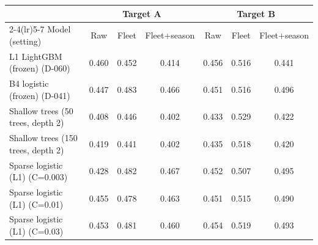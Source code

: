 \begin{tabular}{@{}lcccccc@{}}
\toprule
 & \multicolumn{3}{c}{Target A} & \multicolumn{3}{c}{Target B} \\
\cmidrule(lr){2-4}\cmidrule(lr){5-7}
Model (setting) & Raw & Fleet & Fleet+season & Raw & Fleet & Fleet+season \\
\midrule
L1 LightGBM (frozen) (D-060) & 0.460 & 0.452 & 0.414 & 0.456 & 0.516 & 0.441 \\
B4 logistic (frozen) (D-041) & 0.447 & 0.483 & 0.466 & 0.451 & 0.516 & 0.496 \\
Shallow trees (50 trees, depth 2) & 0.408 & 0.446 & 0.402 & 0.433 & 0.529 & 0.422 \\
Shallow trees (150 trees, depth 2) & 0.419 & 0.441 & 0.402 & 0.435 & 0.518 & 0.420 \\
Sparse logistic (L1) (C=0.003) & 0.428 & 0.482 & 0.467 & 0.452 & 0.507 & 0.495 \\
Sparse logistic (L1) (C=0.01) & 0.455 & 0.478 & 0.463 & 0.451 & 0.515 & 0.490 \\
Sparse logistic (L1) (C=0.03) & 0.453 & 0.481 & 0.460 & 0.454 & 0.519 & 0.493 \\
\bottomrule
\end{tabular}

